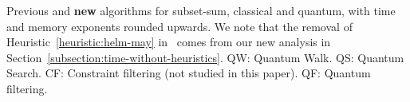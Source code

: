 
\begin{table}
\centering
\caption{Previous and {\bf new} algorithms for subset-sum, classical and quantum, with time and memory exponents rounded upwards. We note that the removal of Heuristic~\ref{heuristic:helm-may} in~\cite{DBLP:conf/pqcrypto/BernsteinJLM13,DBLP:conf/tqc/HelmM18} comes from our new analysis in Section~\ref{subsection:time-without-heuristics}. QW: Quantum Walk. QS: Quantum Search. CF: Constraint filtering (not studied in this paper). QF: Quantum filtering.}
\label{table:results}


\end{table}
